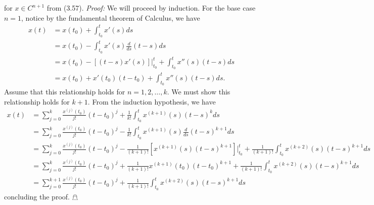 \documentclass{article}
\begin{document}
\begin{itemize}
    for $x \in C^{n + 1}$ from (3.57).
    \newline\newline
    \textit{Proof:} We will proceed by induction. For the base case $n = 1$, notice by the fundamental theorem of Calculus, we have
    \begin{align*}
        x(t) &= x(t_0) + \int_{t_0}^t x'(s)ds\\
        &= x(t_0) - \int_{t_0}^t x'(s)\frac{d}{ds}(t - s)ds\\
        &= x(t_0) - [(t - s)x'(s)]|_{t_0}^t + \int_{t_0}^t x''(s)(t - s)ds\\
        &= x(t_0) + x'(t_0)(t - t_0) + \int_{t_0}^t x''(s)(t - s)ds.
    \end{align*}
    Assume that this relationship holds for $n = 1, 2, \dots, k$. We must show this relationship holds for $k + 1$. From the induction hypothesis, we have
    \begin{align*}
        x(t) &= \sum_{j = 0}^k \frac{x^{(j)}(t_0)}{j!}(t - t_0)^j + \frac{1}{k!}\int_{t_0}^t x^{(k+1)}(s)(t - s)^kds\\
        &= \sum_{j = 0}^k \frac{x^{(j)}(t_0)}{j!}(t - t_0)^j - \frac{1}{k!}\int_{t_0}^t x^{(k+1)}(s) \frac{d}{ds}(t - s)^{k + 1} ds\\
        &= \sum_{j = 0}^k \frac{x^{(j)}(t_0)}{j!}(t - t_0)^j -\frac{1}{(k+1)!}\left[x^{(k+1)}(s)(t - s)^{k+1}\right]\bigg|_{t_0}^t + \frac{1}{(k+1)!}\int_{t_0}^tx^{(k+2)}(s)(t - s)^{k+1}ds\\
        &= \sum_{j = 0}^k \frac{x^{(j)}(t_0)}{j!}(t - t_0)^j + \frac{1}{(k+1)!}x^{(k+1)}(t_0)(t - t_0)^{k+1} + \frac{1}{(k+1)!}\int_{t_0}^t x^{(k+2)}(s)(t-s)^{k+1}ds\\
        &= \sum_{j = 0}^{k+1} \frac{x^{(j)}(t_0)}{j!}(t - t_0)^j + \frac{1}{(k+1)!}\int_{t_0}^t x^{(k+2)}(s)(t - s)^{k+1}ds
    \end{align*}
    concluding the proof. \hfill $\mathghost$
    
\end{itemize}
\end{document}
